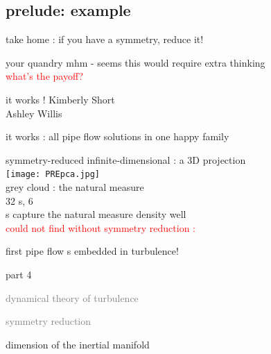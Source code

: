 \subsection[{\cLf} example]{prelude: {\cLf} example}

\begin{frame}{}
\begin{block}{take home :}
{if you have a symmetry, reduce it!}
\end{block}

\bigskip\bigskip\bigskip

\begin{block}{your quandry}
mhm - seems this would require extra thinking
\\
\textcolor{red}{what's the payoff?}
\end{block}
\end{frame}

\begin{frame}{it works !}
Kimberly Short
\\
Ashley Willis
\end{frame}

\begin{frame}{it works : all pipe flow solutions in one happy family}
\begin{block}{}
symmetry-reduced infinite-dimensional {\slice} : a 3D projection
\\
   {\hfill
      \texttt{[image: PREpca.jpg]} %
      \qquad
   }
   \\
grey cloud : the natural measure
\\
  32 \rpo s,  6 \reqva
\\
\po s capture the
natural measure density  well
\\\hfill
\textcolor{red}{could not find without symmetry reduction :}
\end{block}

\bigskip
first pipe flow \rpo s embedded in turbulence!
\end{frame}

\begin{frame}{part 4}
\begin{enumerate}
              \item
    \textcolor{gray}{\small
dynamical theory of turbulence
              \item
\statesp
              \item
symmetry reduction
    }
              \item
    {\Large
dimension of the inertial manifold
                    }
            \end{enumerate}
\end{frame}


